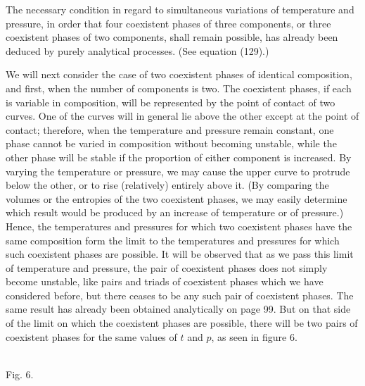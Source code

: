 \documentclass[11pt]{article}
\begin{document}
The necessary condition in regard to simultaneous variations of temperature and pressure, in order that four coexistent phases of three components, or three coexistent phases of two components, shall remain possible, has already been deduced by purely analytical processes. (See equation (129).)

We will next consider the case of two coexistent phases of identical composition, and first, when the number of components is two. The coexistent phases, if each is variable in composition, will be represented by the point of contact of two curves. One of the curves will in general lie above the other except at the point of contact; therefore, when the temperature and pressure remain constant, one phase cannot be varied in composition without becoming unstable, while the other phase will be stable if the proportion of either component is increased. By varying the temperature or pressure, we may cause the upper curve to protrude below the other, or to rise (relatively) entirely above it. (By comparing the volumes or the entropies of the two coexistent phases, we may easily determine which result would be produced by an increase of temperature or of pressure.) Hence, the temperatures and pressures for which two coexistent phases have the same composition form the limit to the temperatures and pressures for which such coexistent phases are possible. It will be observed that as we pass this limit of temperature and pressure, the pair of coexistent phases does not simply become unstable, like pairs and triads of coexistent phases which we have considered before, but there ceases to be any such pair of coexistent phases. The same result has already been obtained analytically on page 99. But on that side of the limit on which the coexistent phases are possible, there will be two pairs of coexistent phases for the same values of $t$ and $p$, as seen in figure 6.

\begin{center}\label{fig:gibbs-v1-p3-fig6}
\\[-0.15em]
{\small Fig. 6.}
\end{center}
\end{document}

